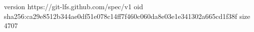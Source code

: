 version https://git-lfs.github.com/spec/v1
oid sha256:ca29e8512b344ae0df51e078c14ff7f460c060da8e03e1e341302a665cd1f38f
size 4707

